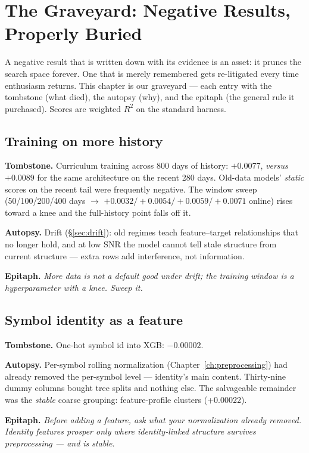 \chapter[The Graveyard of Negative Results]{The Graveyard: Negative Results, Properly Buried}
\label{ch:negative}

A negative result that is written down with its evidence is an asset: it
prunes the search space forever. One that is merely remembered gets
re-litigated every time enthusiasm returns. This chapter is our graveyard
--- each entry with the tombstone (what died), the autopsy (why), and the
epitaph (the general rule it purchased). Scores are weighted $R^2$ on the
standard harness.

\section{Training on more history}

\textbf{Tombstone.} Curriculum training across 800 days of history:
$+0.0077$, \emph{versus} $+0.0089$ for the same architecture on the recent
280 days. Old-data models' \emph{static} scores on the recent tail were
frequently negative. The window sweep (50/100/200/400 days $\to$
$+0.0032/+0.0054/+0.0059/+0.0071$ online) rises toward a knee and the
full-history point falls off it.

\textbf{Autopsy.} Drift (\S\ref{sec:drift}): old regimes teach
feature--target relationships that no longer hold, and at low SNR the
model cannot tell stale structure from current structure --- extra rows
add interference, not information.

\textbf{Epitaph.} \emph{More data is not a default good under drift; the
training window is a hyperparameter with a knee. Sweep it.}

\section{Symbol identity as a feature}

\textbf{Tombstone.} One-hot symbol id into XGB: $-0.00002$.

\textbf{Autopsy.} Per-symbol rolling normalization
(Chapter~\ref{ch:preprocessing}) had already removed the per-symbol level
--- identity's main content. Thirty-nine dummy columns bought tree splits
and nothing else. The salvageable remainder was the \emph{stable} coarse
grouping: feature-profile clusters (+0.00022).

\textbf{Epitaph.} \emph{Before adding a feature, ask what your
normalization already removed. Identity features prosper only where
identity-linked structure survives preprocessing --- and is stable.}

